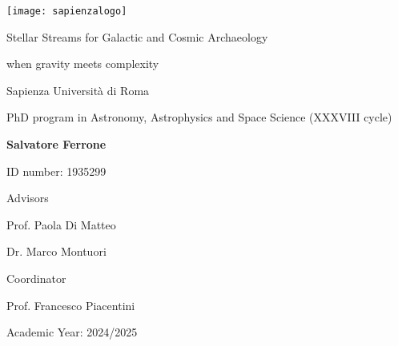 \begin{titlepage}
\linespread{1}\selectfont
{}
\sffamily
\setlength{\parindent}{0pt}

\vspace*{-10mm}

\texttt{[image: sapienzalogo]}

\vspace{1cm}

\vfill

\vfill
\hspace{1.5cm}
\begin{minipage}{0.75\textwidth}
    {\LARGE\linespread{1.1}\selectfont\textcolor{sapred}{Stellar Streams for Galactic and Cosmic Archaeology}\par}
\end{minipage}

\hspace{1.5cm}
\begin{minipage}{0.75\textwidth}
    {\large\linespread{1.1}\selectfont\textcolor{sapred}{when gravity meets complexity}\par}
\end{minipage}

\vfill
\vfill
\vfill
\hspace{1.5cm}
\textcolor{sapred}{Sapienza Università di Roma}

\hspace{1.5cm}
\textcolor{sapred}{PhD program in Astronomy, Astrophysics and Space Science (XXXVIII cycle)}

\vfill
\hspace{1.5cm}
{\bfseries Salvatore Ferrone}

\hspace{1.5cm}
ID number: 1935299

\vfill
\hspace{1.5cm}
Advisors

\hspace{1.5cm}
Prof. Paola Di Matteo

\hspace{1.5cm}
Dr. Marco Montuori


\vfill
\hspace{1.5cm}
Coordinator

\hspace{1.5cm}
Prof. Francesco Piacentini

\vfill 

\hspace{1.5cm}
Academic Year: 2024/2025


\end{titlepage}